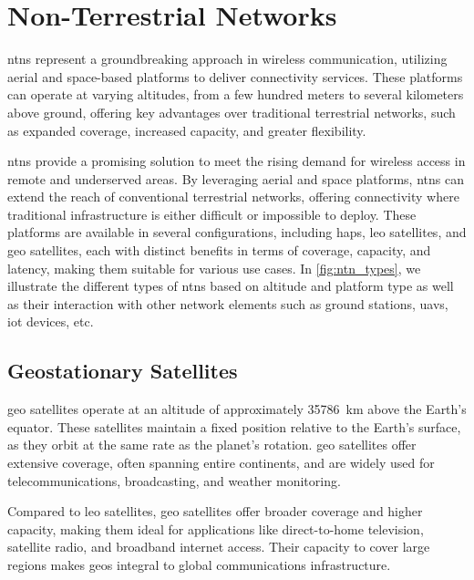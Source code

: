 \chapter{Non-Terrestrial Networks}
\label{ch:non_terrestrial_networks}

\glspl{ntn} represent a groundbreaking approach in wireless communication, utilizing aerial and space-based platforms to deliver connectivity services. These platforms can operate at varying altitudes, from a few hundred meters to several kilometers above ground, offering key advantages over traditional terrestrial networks, such as expanded coverage, increased capacity, and greater flexibility.

\glspl{ntn} provide a promising solution to meet the rising demand for wireless access in remote and underserved areas. By leveraging aerial and space platforms, \glspl{ntn} can extend the reach of conventional terrestrial networks, offering connectivity where traditional infrastructure is either difficult or impossible to deploy. These platforms are available in several configurations, including \glspl{hap}, \gls{leo} satellites, and \gls{geo} satellites, each with distinct benefits in terms of coverage, capacity, and latency, making them suitable for various use cases. In \cref{fig:ntn_types}, we illustrate the different types of \glspl{ntn} based on altitude and platform type as well as their interaction with other network elements such as ground stations, \glspl{uav}, \gls{iot} devices, etc.

\section{Geostationary Satellites}

\gls{geo} satellites operate at an altitude of approximately \SI{35786}{\kilo\meter} above the Earth's equator. These satellites maintain a fixed position relative to the Earth’s surface, as they orbit at the same rate as the planet's rotation. \gls{geo} satellites offer extensive coverage, often spanning entire continents, and are widely used for telecommunications, broadcasting, and weather monitoring.

Compared to \gls{leo} satellites, \gls{geo} satellites offer broader coverage and higher capacity, making them ideal for applications like direct-to-home television, satellite radio, and broadband internet access. Their capacity to cover large regions makes \glspl{geo} integral to global communications infrastructure.


